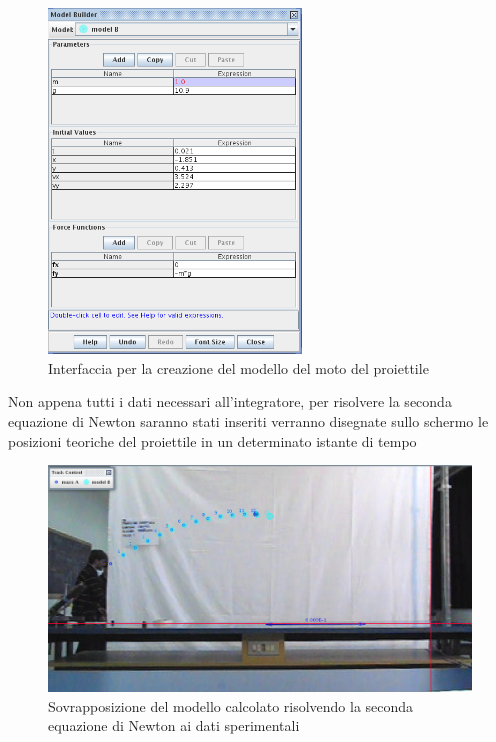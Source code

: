 \documentclass[a4paper,10pt,oneside]{article}
\begin{document}
\begin{figure}[H]
 \centering
 \includegraphics[width=0.6\textwidth]{./immagini/tracker_model_builder.png}
 \caption{Interfaccia per la creazione del modello del moto del proiettile}
 \label{fig:model_builder}
\end{figure}

Non appena tutti i dati necessari all'integratore, per risolvere la seconda equazione di Newton saranno stati inseriti verranno disegnate sullo schermo le posizioni teoriche del proiettile in un determinato istante di tempo


\begin{figure}[H]
 \centering
 \includegraphics[width=\textwidth]{./immagini/tracker_model_over_data.png}
 \caption{Sovrapposizione del modello calcolato risolvendo la seconda equazione di Newton ai dati sperimentali}
 \label{fig:model_over_data}
\end{figure}
\end{document}
